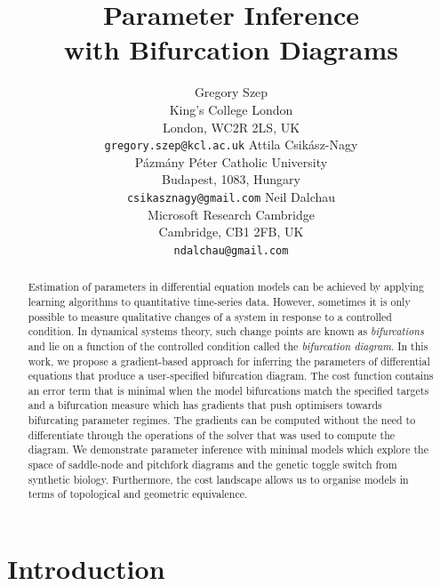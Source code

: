 \documentclass{article}
\title{Parameter Inference\\with Bifurcation Diagrams}
\author{
        Gregory Szep\\King's College London\\London, WC2R 2LS, UK\\
        \texttt{gregory.szep@kcl.ac.uk}
    \And
        Attila Csik\'asz-Nagy\\P\'azm\'any P\'eter Catholic University\\Budapest, 1083, Hungary\\
        \texttt{csikasznagy@gmail.com}
    \And
        Neil Dalchau\\Microsoft Research Cambridge\\Cambridge, CB1 2FB, UK\\
        \texttt{ndalchau@gmail.com}
}
\begin{document}
\newcommand{\rates}{F_{\theta}}
\newcommand{\tangent}{T_{\theta}}
\newcommand{\steadystates}{\partial S_{\theta}}

\newcommand{\Det}{\left| \frac{\partial\rates}{\partial u} \right|}
\newcommand{\measure}{\varphi_{\theta}}

\newcommand{\predictions}{\mathcal{P}}
\newcommand{\targets}{\mathcal{D}}
\newcommand{\loss}{L}
\newcommand{\error}{E}
\newcommand{\Reals}{\mathbb{R}}

\maketitle
\begin{abstract}
    Estimation of parameters in differential equation models can be achieved by applying learning algorithms to quantitative time-series data. However, sometimes it is only possible to measure qualitative changes of a system in response to a controlled condition. In dynamical systems theory, such change points are known as \textit{bifurcations} and lie on a function of the controlled condition called the \textit{bifurcation diagram}. In this work, we propose a gradient-based approach for inferring the parameters of differential equations that produce a user-specified bifurcation diagram. The cost function contains an error term that is minimal when the model bifurcations match the specified targets and a bifurcation measure which has gradients that push optimisers towards bifurcating parameter regimes. The gradients can be computed without the need to differentiate through the operations of the solver that was used to compute the diagram. We demonstrate parameter inference with minimal models which explore the space of saddle-node and pitchfork diagrams and the genetic toggle switch from synthetic biology. Furthermore, the cost landscape allows us to organise models in terms of topological and geometric equivalence.
\end{abstract}

\section{Introduction}
\label{section:introduction}
\end{document}
